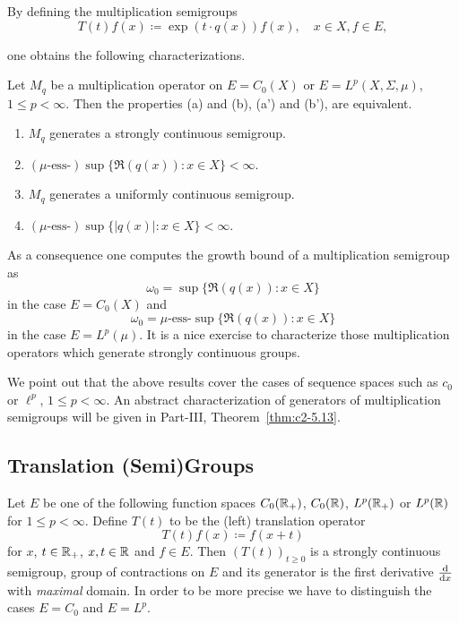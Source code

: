 By defining the multiplication semigroups
\[
    T(t)f(x) \coloneq \exp(t \cdot q(x))f(x), \quad x \in X, f \in E,
\]

one obtains the following characterizations.
\begin{proposition*}\label{prop:a1-2.3}
Let $M_{q}$ be a multiplication operator on $E = C_{0}(X)$ or $E = L^{p}(X,\Sigma,\mu)$, $1 \leq p < \infty$.
Then the properties \upshape(a) and \upshape(b), \resp \upshape(a') and \upshape(b'), are equivalent.
\begin{enumerate}[labelwidth=2em, labelsep=0.5em, leftmargin=3em, align=left]
\item[\upshape (a)] 
	$M_{q}$ generates a strongly continuous semigroup.

\item[\upshape (b)]
	$(\mu\text{-ess-})\sup\{\Re(q(x)) \colon x \in X \} < \infty$.

\item[\upshape(a')] 
	$M_{q}$ generates a uniformly continuous semigroup.

\item[\upshape(b')] 
	$(\mu\text{-ess-})\sup\{|q(x)| \colon x \in X \} < \infty$.
\end{enumerate}
\end{proposition*}
As a consequence one computes the growth bound of a multiplication semigroup as
\[
    \omega_{0} = \sup\{\Re(q(x)) \colon x \in X\} 
\]
in the case $E = C_{0}(X)$ and 
\[
    \omega_{0} = \mu\text{-ess-}\sup\{\Re(q(x)) \colon x \in X\} 
\]
in the case  $E = L^{p}(\mu)$.
It is a nice exercise to characterize those multiplication operators which generate strongly continuous groups.

We point out that the above results cover the cases of sequence spaces such as $c_{0}$ or $\ell^{p}$, $1 \leq p < \infty$.
An abstract characterization of generators of multiplication semigroups will be given in Part-III, Theorem~\ref{thm:c2-5.13}.
\subsection{Translation (Semi)Groups}\label{subsec:a1-2.4}%
Let $E$ be one of the following function spaces $C_{0}(\mathbb{R}_{+})$, $C_{0}(\mathbb{R})$, $L^{p}(\mathbb{R}_{+})$ or $L^{p}(\mathbb{R})$ for $1 \leq p < \infty$.
Define $T(t)$ to be the (left) translation operator
\[
    T(t)f(x) \coloneq f(x+t)
\]
for $x$, $ t \in \mathbb{R}_{+}$, \resp $x, t \in \mathbb{R}$ and $f \in E$.
Then $(T(t))_{t \geq 0}$ is a strongly continuous semigroup, \resp group of contractions on $E$ and its generator is the first derivative $\frac{\mathop{}\!\mathrm{d}{}}{\mathop{}\!\mathrm{d}{x}}$ with \emph{maximal} domain.
In order to be more precise we have to distinguish the cases $E = C_{0}$ and $E = L^{p}$.

